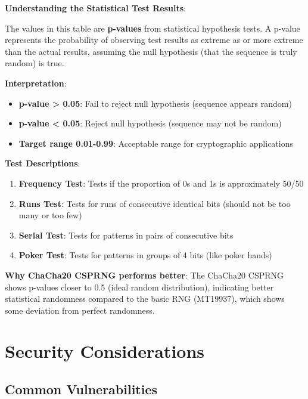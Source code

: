 \documentclass[11pt,a4paper]{article}
\begin{document}
\begin{mathbox}
\textbf{Understanding the Statistical Test Results}:

The values in this table are \textbf{p-values} from statistical hypothesis tests. A p-value represents the probability of observing test results as extreme as or more extreme than the actual results, assuming the null hypothesis (that the sequence is truly random) is true.

\textbf{Interpretation}:
\begin{itemize}
    \item \textbf{p-value > 0.05}: Fail to reject null hypothesis (sequence appears random)
    \item \textbf{p-value < 0.05}: Reject null hypothesis (sequence may not be random)
    \item \textbf{Target range 0.01-0.99}: Acceptable range for cryptographic applications
\end{itemize}

\textbf{Test Descriptions}:
\begin{enumerate}
    \item \textbf{Frequency Test}: Tests if the proportion of 0s and 1s is approximately 50/50
    \item \textbf{Runs Test}: Tests for runs of consecutive identical bits (should not be too many or too few)
    \item \textbf{Serial Test}: Tests for patterns in pairs of consecutive bits
    \item \textbf{Poker Test}: Tests for patterns in groups of 4 bits (like poker hands)
\end{enumerate}

\textbf{Why ChaCha20 CSPRNG performs better}:
The ChaCha20 CSPRNG shows p-values closer to 0.5 (ideal random distribution), indicating better statistical randomness compared to the basic RNG (MT19937), which shows some deviation from perfect randomness.
\end{mathbox}

\section{Security Considerations}

\subsection{Common Vulnerabilities}
\end{document}
